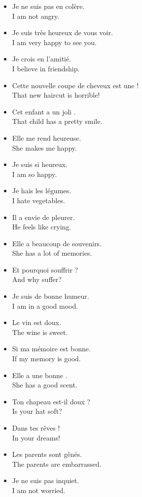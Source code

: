 \begin{itemize}
	\item  Je ne suis pas en col{\`e}re. \\ I am not angry.
	\item  Je suis tr{\`e}s heureux de vous voir. \\ I am very happy to see you.
	\item  Je crois en l'amiti{\'e}. \\ I believe in friendship.
	\item  Cette nouvelle coupe de cheveux est une  ! \\ That new haircut is horrible!
	\item  Cet enfant a un joli . \\ That child has a pretty smile.
	\item  Elle me rend heureuse. \\ She makes me happy.
	\item  Je suis si heureux. \\ I am so happy.
	\item  Je hais les l{\'e}gumes. \\ I hate vegetables.
	\item  Il a envie de pleurer. \\ He feels like crying.
	\item  Elle a beaucoup de souvenirs. \\ She has a lot of memories.
	\item  Et pourquoi souffrir ? \\ And why suffer?
	\item  Je suis de bonne humeur. \\ I am in a good mood.
	\item  Le vin est doux. \\ The wine is sweet.
	\item  Si ma m{\'e}moire est bonne. \\ If my memory is good.
	\item  Elle a une bonne . \\ She has a good scent.
	\item  Ton chapeau est-il doux ? \\ Is your hat soft?
	\item  Dans tes r{\^e}ves ! \\ In your dreams!
	\item  Les parents sont g{\^e}n{\'e}s. \\ The parents are embarrassed.
	\item  Je ne suis pas inquiet. \\ I am not worried.

\end{itemize}
